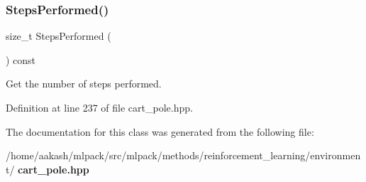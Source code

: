 \subsubsection{Steps\+Performed()}
{\footnotesize\ttfamily size\+\_\+t Steps\+Performed (\begin{DoxyParamCaption}{ }\end{DoxyParamCaption}) const\hspace{0.3cm}{\ttfamily [inline]}}



Get the number of steps performed. 



Definition at line 237 of file cart\+\_\+pole.\+hpp.



The documentation for this class was generated from the following file\+:\begin{DoxyCompactItemize}
\item 
/home/aakash/mlpack/src/mlpack/methods/reinforcement\+\_\+learning/environment/\textbf{ cart\+\_\+pole.\+hpp}\end{DoxyCompactItemize}
